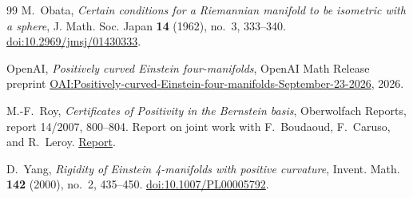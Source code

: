 \begin{thebibliography}{99}
M.~Obata, \emph{Certain conditions for a Riemannian manifold to be isometric with a sphere},
J. Math. Soc. Japan \textbf{14} (1962), no.~3, 333--340.
\href{https://doi.org/10.2969/jmsj/01430333}{doi:10.2969/jmsj/01430333}.

OpenAI, \emph{Positively curved Einstein four-manifolds},
OpenAI Math Release preprint
\href{https://github.com/openai/math/blob/main/preprints/Positively-curved-Einstein-four-manifolds-September-23-2026/paper.pdf}{OAI:Positively-curved-Einstein-four-manifolds-September-23-2026},
2026.

M.-F.~Roy, \emph{Certificates of Positivity in the Bernstein basis}, Oberwolfach Reports, report 14/2007, 800--804. Report on joint work with F.~Boudaoud, F.~Caruso, and R.~Leroy. \href{https://ems.press/content/serial-article-files/46100}{Report}.

D.~Yang, \emph{Rigidity of Einstein 4-manifolds with positive curvature}, Invent. Math. \textbf{142} (2000), no.~2, 435--450.
\href{https://doi.org/10.1007/PL00005792}{doi:10.1007/PL00005792}.

\end{thebibliography}
